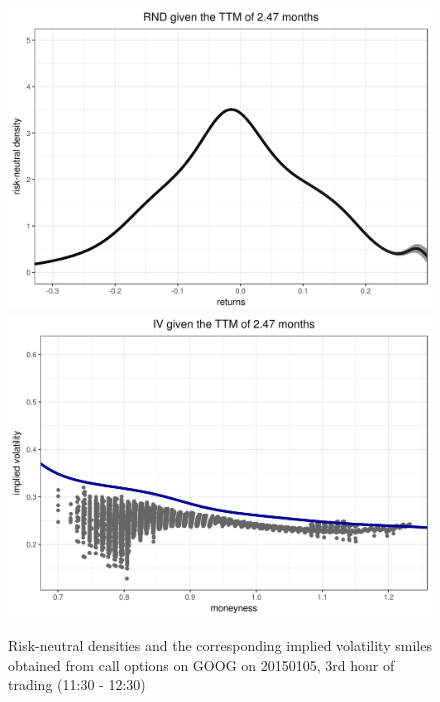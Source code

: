 \documentclass[a4paper,12pt]{article}
\theoremstyle{plain}
\theoremstyle{definition}
\begin{document}
\begin{figure}[H]
\begin{center}
 \endminipage\\
 \includegraphics[width=\linewidth]{figures/hour_3th/GOOG_20150105_rnd_ci_3th_hour_ttm_2_47.png}
 \endminipage
 \hspace{3mm}
 \includegraphics[width=\linewidth]{figures/hour_3th/GOOG_20150105_iv_smile_3th_hour_ttm_2_47.png}
 \endminipage
\end{center}
\vspace{-3mm}
\caption{\footnotesize Risk-neutral densities and the corresponding implied volatility smiles obtained from call options on GOOG on 20150105, 3rd hour of trading (11:30 - 12:30)} 
\label{rnd2}
\end{figure}

\newpage
\end{document}
